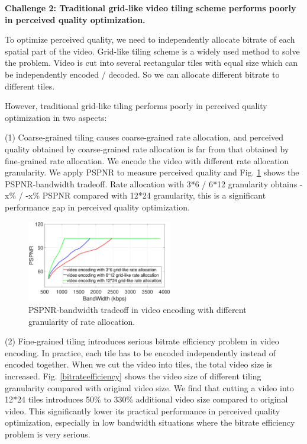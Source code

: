\textbf{Challenge 2: Traditional grid-like video tiling scheme performs poorly in perceived quality optimization.} 

To optimize perceived quality, we need to independently allocate bitrate of each spatial part of the video. Grid-like tiling scheme is a widely used method to solve the problem. Video is cut into several rectangular tiles with equal size which can be independently encoded / decoded. So we can allocate different bitrate to different tiles.

However, traditional grid-like tiling performs poorly in perceived quality optimization in two aspects: 

(1) Coarse-grained tiling causes coarse-grained rate allocation, and perceived quality obtained by coarse-grained rate allocation is far from that obtained by fine-grained rate allocation. We encode the video with different rate allocation granularity. We apply PSPNR to measure perceived quality and Fig. \ref{optimalencoding} shows the PSPNR-bandwidth tradeoff. Rate allocation with 3*6 / 6*12 granularity obtains -x\% / -x\% PSPNR compared with 12*24 granularity, this is a significant performance gap in perceived quality optimization.

\begin{figure}
  \centering
  \includegraphics[width=2.5in]{images/optimalencoding.eps}
  \caption{PSPNR-bandwidth tradeoff in video encoding with different granularity of rate allocation.}
  \label{optimalencoding}
  \end{figure}

(2) Fine-grained tiling introduces serious bitrate efficiency problem in video encoding. In practice, each tile has to be encoded independently instead of encoded together. When we cut the video into tiles, the total video size is increased. Fig. \ref{bitrateefficiency} shows the video size of different tiling granularity compared with original video size. We find that cutting a video into 12*24 tiles introduces 50\% to 330\% additional video size compared to original video. This significantly lower its practical performance in perceived quality optimization, especially in low bandwidth situations where the bitrate efficiency problem is very serious.

